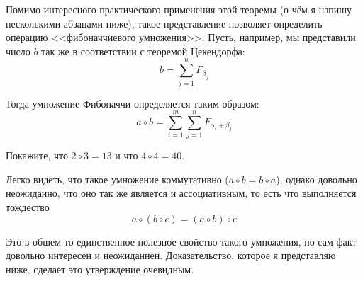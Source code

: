 Помимо интересного практического применения этой теоремы (о чём я напишу несколькими абзацами ниже), такое представление позволяет определить операцию <<фибоначчиевого умножения>>. Пусть, например, мы представили число $b$ так же в соответствии с теоремой Цекендорфа:
$$b = \sum_{j=1}^n F_{\beta_j}$$

Тогда умножение Фибоначчи определяется таким образом:
$$a\circ b = \sum_{i=1}^m\sum_{j=1}^n F_{\alpha_i+\beta_j}$$

\begin{exercise}
Покажите, что $2\circ3 = 13$ и что $4\circ4 = 40$.
\end{exercise}

Легко видеть, что такое умножение коммутативно ($a\circ b = b\circ a$), однако довольно неожиданно, что оно так же является и ассоциативным, то есть что выполняется тождество
$$a\circ(b\circ c) = (a\circ b)\circ c$$

Это в общем-то единственное полезное свойство такого умножения, но сам факт довольно интересен и неожиданнен. Доказательство, которое я представляю ниже, сделает это утверждение очевидным.

